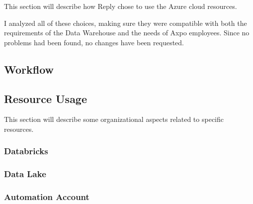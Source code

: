 This section will describe how Reply chose to use the Azure cloud resources.

I analyzed all of these choices, making sure they were compatible with both the requirements of the Data Warehouse and the needs of Axpo employees.
Since no problems had been found, no changes have been requested.

\subsection{Workflow}
    
\subsection{Resource Usage}
    This section will describe some organizational aspects related to specific resources.
    
    \subsubsection{Databricks}
        
    \subsubsection{Data Lake}
        
    \subsubsection{Automation Account}
        